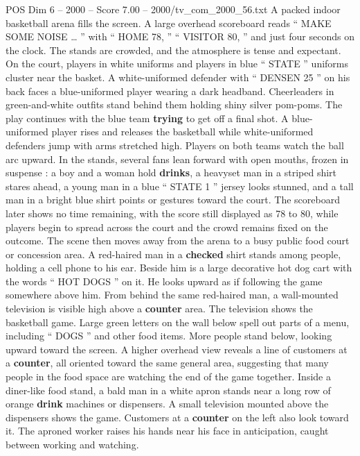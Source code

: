 \begin{textsample}{POS Dim 6 – 2000 – Score 7.00 – 2000/tv\_com\_2000\_56.txt}  \label{ex:f6_pos_057}
A packed indoor basketball arena fills the screen.
A large overhead scoreboard reads “ MAKE SOME NOISE … ” with “ HOME 78, ” “ VISITOR 80, ” and just four seconds on the clock.
The stands are crowded, and the atmosphere is tense and expectant.
On the court, players in white uniforms and players in blue “ STATE ” uniforms cluster near the basket.
A white-uniformed defender with “ DENSEN 25 ” on his back faces a blue-uniformed player wearing a dark headband.
Cheerleaders in green-and-white outfits stand behind them holding shiny silver pom-poms.
The play continues with the blue team \textbf{trying} to get off a final shot.
A blue-uniformed player rises and releases the basketball while white-uniformed defenders jump with arms stretched high.
Players on both teams watch the ball arc upward.
In the stands, several fans lean forward with open mouths, frozen in suspense : a boy and a woman hold \textbf{drinks}, a heavyset man in a striped shirt stares ahead, a young man in a blue “ STATE 1 ” jersey looks stunned, and a tall man in a bright blue shirt points or gestures toward the court.
The scoreboard later shows no time remaining, with the score still displayed as 78 to 80, while players begin to spread across the court and the crowd remains fixed on the outcome.
The scene then moves away from the arena to a busy public food court or concession area.
A red-haired man in a \textbf{checked} shirt stands among people, holding a cell phone to his ear.
Beside him is a large decorative hot dog cart with the words “ HOT DOGS ” on it.
He looks upward as if following the game somewhere above him.
From behind the same red-haired man, a wall-mounted television is visible high above a \textbf{counter} area.
The television shows the basketball game.
Large green letters on the wall below spell out parts of a menu, including “ DOGS ” and other food items.
More people stand below, looking upward toward the screen.
A higher overhead view reveals a line of customers at a \textbf{counter}, all oriented toward the same general area, suggesting that many people in the food space are watching the end of the game together.
Inside a diner-like food stand, a bald man in a white apron stands near a long row of orange \textbf{drink} machines or dispensers.
A small television mounted above the dispensers shows the game.
Customers at a \textbf{counter} on the left also look toward it.
The aproned worker raises his hands near his face in anticipation, caught between working and watching.

\end{textsample}
